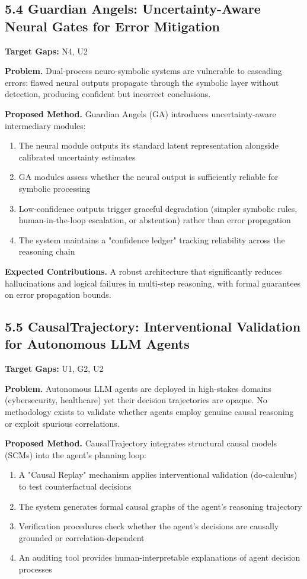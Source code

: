 \documentclass[11pt,a4paper]{article}
\begin{document}
\subsection{5.4 Guardian Angels: Uncertainty-Aware Neural Gates for Error Mitigation}

\textbf{Target Gaps:} N4, U2

\textbf{Problem.} Dual-process neuro-symbolic systems are vulnerable to cascading errors: flawed neural outputs propagate through the symbolic layer without detection, producing confident but incorrect conclusions.

\textbf{Proposed Method.} Guardian Angels (GA) introduces uncertainty-aware intermediary modules:
\begin{enumerate}
  \item The neural module outputs its standard latent representation alongside calibrated uncertainty estimates
  \item GA modules assess whether the neural output is sufficiently reliable for symbolic processing
  \item Low-confidence outputs trigger graceful degradation (simpler symbolic rules, human-in-the-loop escalation, or abstention) rather than error propagation
  \item The system maintains a "confidence ledger" tracking reliability across the reasoning chain
\end{enumerate}

\textbf{Expected Contributions.} A robust architecture that significantly reduces hallucinations and logical failures in multi-step reasoning, with formal guarantees on error propagation bounds.

\subsection{5.5 CausalTrajectory: Interventional Validation for Autonomous LLM Agents}

\textbf{Target Gaps:} U1, G2, U2

\textbf{Problem.} Autonomous LLM agents are deployed in high-stakes domains (cybersecurity, healthcare) yet their decision trajectories are opaque. No methodology exists to validate whether agents employ genuine causal reasoning or exploit spurious correlations.

\textbf{Proposed Method.} CausalTrajectory integrates structural causal models (SCMs) into the agent's planning loop:
\begin{enumerate}
  \item A "Causal Replay" mechanism applies interventional validation (do-calculus) to test counterfactual decisions
  \item The system generates formal causal graphs of the agent's reasoning trajectory
  \item Verification procedures check whether the agent's decisions are causally grounded or correlation-dependent
  \item An auditing tool provides human-interpretable explanations of agent decision processes
\end{enumerate}
\end{document}
